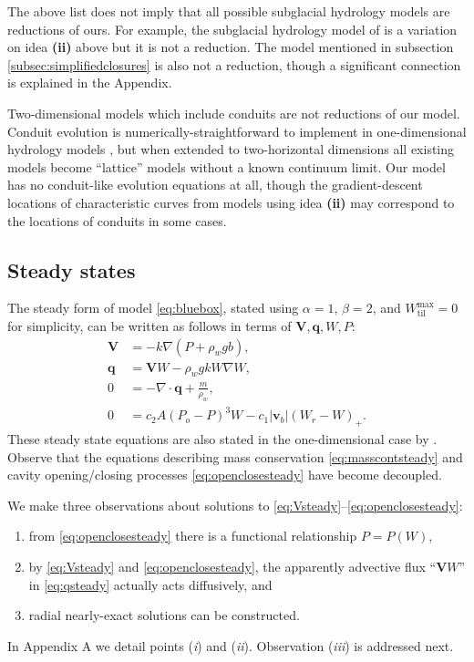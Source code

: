 \documentclass[gmd]{copernicus}   %
\begin{document}
The above list does not imply that all possible subglacial hydrology models are reductions of ours.  For example, the subglacial hydrology model of \cite{JohnsonFastook} is a variation on idea \textbf{(ii)} above but it is not a reduction.  The \cite{FlowersClarke2002_theory} model mentioned in subsection \ref{subsec:simplifiedclosures} is also not a reduction, though a significant connection is explained in the Appendix.

Two-dimensional models which include conduits \citep{Schoofmeltsupply} are not reductions of our model.  Conduit evolution is numerically-straightforward to implement in one-dimensional hydrology models \citep{Hewittetal2012,vanderWeletal2013}, but when extended to two-horizontal dimensions all existing models \citep{Schoofmeltsupply,Hewitt2013,Werderetal2013} become ``lattice'' models without a known continuum limit.  Our model has no conduit-like evolution equations at all, though the gradient-descent locations of characteristic curves from models using idea \textbf{(ii)} may correspond to the locations of conduits in some cases.

\subsection{Steady states}  \label{subsec:steady}  The steady form of model \eqref{eq:bluebox}, stated using $\alpha=1$, $\beta=2$, and $W_{\text{til}}^{\text{max}}=0$ for simplicity, can be written as follows in terms of $\mathbf{V},\mathbf{q},W,P$:
\begin{align}
\mathbf{V} &= - k \nabla \left(P + \rho_w g b\right), \label{eq:Vsteady} \\
\mathbf{q} &= \mathbf{V} W - \rho_w g k W \nabla W, \label{eq:qsteady} \\
0 &= - \nabla\cdot \mathbf{q} + \frac{m}{\rho_w}, \label{eq:masscontsteady} \\
0 &= c_2 A (P_o - P)^3 W - c_1 |\mathbf{v}_b| (W_r - W)_+. \label{eq:openclosesteady}
\end{align}
These steady state equations are also stated in the one-dimensional case by \cite{Schoofetal2012}.  Observe that the equations describing mass conservation \eqref{eq:masscontsteady} and cavity opening/closing processes \eqref{eq:openclosesteady} have become decoupled.

We make three observations about solutions to \eqref{eq:Vsteady}--\eqref{eq:openclosesteady}:
\renewcommand{\labelenumi}{(\emph{\roman{enumi}})}
\begin{enumerate}
\item from \eqref{eq:openclosesteady} there is a functional relationship $P=P(W)$,
\item by \eqref{eq:Vsteady} and \eqref{eq:openclosesteady}, the apparently advective flux ``$\mathbf{V} W$'' in \eqref{eq:qsteady} actually acts diffusively, and
\item radial nearly-exact solutions can be constructed.
\end{enumerate}
In Appendix A we detail points (\emph{i}) and (\emph{ii}).  Observation (\emph{iii}) is addressed next.
\end{document}
